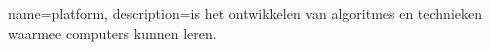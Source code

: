 {
    name=platform,
    description={is het ontwikkelen van algoritmes en technieken waarmee computers kunnen leren.}
}